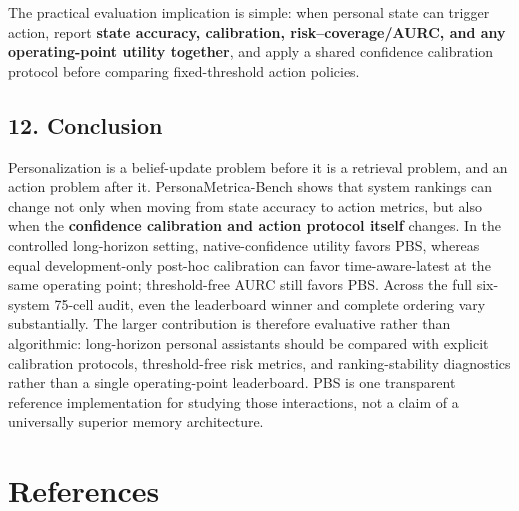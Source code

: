 \documentclass[
  10pt,
  letterpaper,
]{article}
\begin{document}
The practical evaluation implication is simple: when personal state can
trigger action, report \textbf{state accuracy, calibration,
risk--coverage/AURC, and any operating-point utility together}, and
apply a shared confidence calibration protocol before comparing
fixed-threshold action policies.

\subsection{12. Conclusion}\label{conclusion}

Personalization is a belief-update problem before it is a retrieval
problem, and an action problem after it. PersonaMetrica-Bench shows that
system rankings can change not only when moving from state accuracy to
action metrics, but also when the \textbf{confidence calibration and
action protocol itself} changes. In the controlled long-horizon setting,
native-confidence utility favors PBS, whereas equal development-only
post-hoc calibration can favor time-aware-latest at the same operating
point; threshold-free AURC still favors PBS. Across the full six-system
75-cell audit, even the leaderboard winner and complete ordering vary
substantially. The larger contribution is therefore evaluative rather
than algorithmic: long-horizon personal assistants should be compared
with explicit calibration protocols, threshold-free risk metrics, and
ranking-stability diagnostics rather than a single operating-point
leaderboard. PBS is one transparent reference implementation for
studying those interactions, not a claim of a universally superior
memory architecture.

\section*{References}\label{bibliography}
\end{document}
